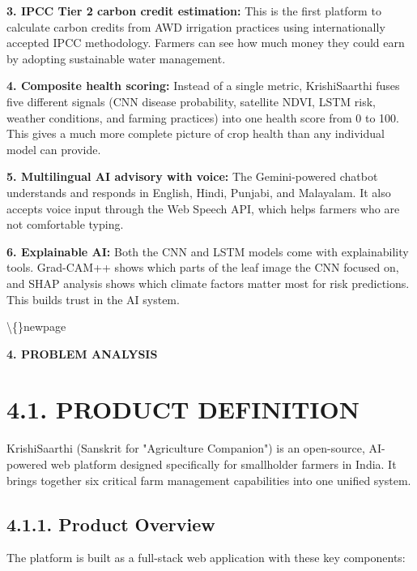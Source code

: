 \documentclass[12pt, a4paper]{report}
\begin{document}
\textbf{3. IPCC Tier 2 carbon credit estimation:} This is the first platform to calculate carbon credits from AWD irrigation practices using internationally accepted IPCC methodology. Farmers can see how much money they could earn by adopting sustainable water management.

\textbf{4. Composite health scoring:} Instead of a single metric, KrishiSaarthi fuses five different signals (CNN disease probability, satellite NDVI, LSTM risk, weather conditions, and farming practices) into one health score from 0 to 100. This gives a much more complete picture of crop health than any individual model can provide.

\textbf{5. Multilingual AI advisory with voice:} The Gemini-powered chatbot understands and responds in English, Hindi, Punjabi, and Malayalam. It also accepts voice input through the Web Speech API, which helps farmers who are not comfortable typing.

\textbf{6. Explainable AI:} Both the CNN and LSTM models come with explainability tools. Grad-CAM++ shows which parts of the leaf image the CNN focused on, and SHAP analysis shows which climate factors matter most for risk predictions. This builds trust in the AI system.

\textbackslash\{\}newpage

\begin{center}
{\fontsize{14}{17}\bfseries 4. PROBLEM ANALYSIS}\\
\end{center}
\section{4.1. PRODUCT DEFINITION}
KrishiSaarthi (Sanskrit for "Agriculture Companion") is an open-source, AI-powered web platform designed specifically for smallholder farmers in India. It brings together six critical farm management capabilities into one unified system.

\subsection{4.1.1. Product Overview}
The platform is built as a full-stack web application with these key components:
\end{document}
